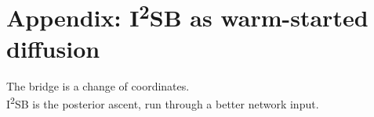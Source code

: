 \documentclass[aspectratio=169, 11pt]{beamer}
\begin{document}
\appendix
\section*{Appendix: I\textsuperscript{2}SB as warm-started diffusion}

{
\begin{frame}[standout]
The bridge is a change of coordinates.\\[8pt]
{\normalsize I\textsuperscript{2}SB is the posterior ascent, run through a better network input.}
\end{frame}}

\end{document}
